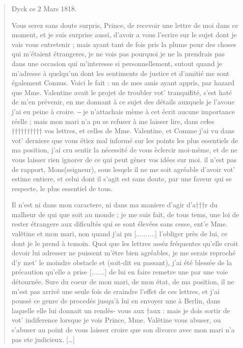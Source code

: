 \documentclass[a4paper,12pt,twoside]{book}
\begin{document}
			\begin{quotation}
				\begin{flushright}
					Dyck ce 2 Mars 1818.
				\end{flushright}
				
				Vous serez sans doute surpris, Prince, de recevoir une lettre
				de moi dans ce moment, et je suis surprise aussi, d'avoir a vous
				l'ecrire sur le sujet dont je vais vous entretenir ; mais ayant tant
				de fois pris la plume pour des choses qui m'étaient étrangeres, je ne
				vois pas pourquoi je ne la prendrais pas dans une occasion qui
				m'interesse si personnellement, sutout quand je m'adresse à quelqu'un
				dont les sentiments de justice et d'amitié me sont également Connus.
				Voici le fait : un de mes amis ayant appris, par hazard que
				Mme. Valentine avait le projet de troubler vot' tranquiƚité, s'est
				haté de m'en prévenir, en me donnant à ce sujet des détails auxquels
				je l'avoue j'ai eu peine à croire. ‒ je n'attachais mème à cet
				écrit aucune importance réelle ; mais mon mari n'a pu se refuser
				à me laisser lire, dans ceƚes †††††††††† vos lettres, et celles de
				Mme. Valentine, et Comme j'ai vu dans vot' derniere que
				vous étiez mal informé sur les points les plus essentiels de ma
				position, j'ai cru sentir la nécessité de vous èclercir moi-mème,
				et de ne vous laisser rien ignorer de ce qui peut gèner vos idées
				sur moi. il n'est pas de rapport, Mons(seigneur), sous lesqels il ne
				me soit agréable d'avoir vot' estime entiere, et celui dont
				il s'agit est sans doute, par une faveur qui se respecte, le plus
				essentiel de tous.
				
				Il n'est ni dans mon caractere, ni dans ma maniere d'agir d'a†††r
				du malheur de qui que soit au monde ; je me suis fait, de tous
				tems, une loi de rester étrangere aux dificultés qui se sont élevées
				sans cesse, ent'e Mme. valẽtine et mon mari, non quand j'ai
				pu [..........] l'obliger près de lui, ce dont je le prend à temoin.
				Quoi que les lettres asséz fréquentes qu'elle croit devoir lui adresser ne
				puissent m'être bien agréables, je me serais reproché d'y met' le
				moindre obstacle et (soit-dit en passant), j'ai été blessée de la précaution
				qu'elle a prise [.......] de lui en faire remetre une par une
				voie détournée. Sure du coeur de mon mari, de mon état, de
				ma position, il ne m'est pas arrivé une seule fois de craindre
				l'effet de ces lettres, et j'ai poussé ce genre de procedés jusqu'à lui en
				envoyer une à Berlin, dans laquelle elle lui donnait un rendès-
				vous aux †aux : mais je dois sortir de vot' indiference lorsque
				je vois Prince, Mme. Valẽtine vous abuser, ou s'abuser au
				point de vous laisser croire que son divorce avec mon mari
				n'a pas ete judicieux. […]
				
			\end{quotation}
			
\end{document}
